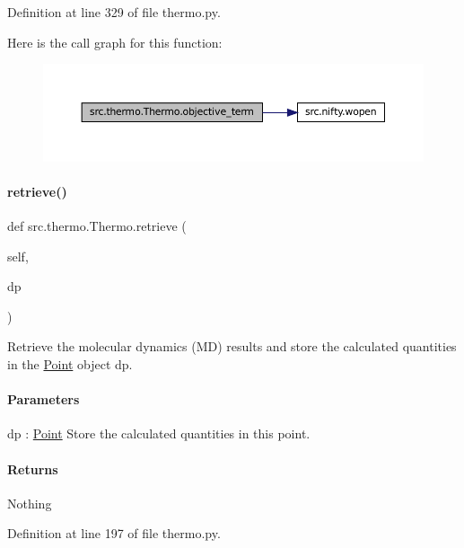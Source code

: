 Definition at line 329 of file thermo.\+py.

Here is the call graph for this function\+:
\nopagebreak
\begin{figure}[H]
\begin{center}
\leavevmode
\includegraphics[width=350pt]{classsrc_1_1thermo_1_1Thermo_abb7c8739b6b88d7dd08a80f5561ba6f1_cgraph}
\end{center}
\end{figure}
\mbox{\label{classsrc_1_1thermo_1_1Thermo_a9d63adfe6c3808c186a47d194de9d851}} 
\paragraph{\texorpdfstring{retrieve()}{retrieve()}}
{\footnotesize\ttfamily def src.\+thermo.\+Thermo.\+retrieve (\begin{DoxyParamCaption}\item[{}]{self,  }\item[{}]{dp }\end{DoxyParamCaption})}



Retrieve the molecular dynamics (MD) results and store the calculated quantities in the \hyperlink{classsrc_1_1thermo_1_1Point}{Point} object dp. 

\paragraph*{Parameters }

dp \+: \hyperlink{classsrc_1_1thermo_1_1Point}{Point} Store the calculated quantities in this point.

\paragraph*{Returns }

Nothing 

Definition at line 197 of file thermo.\+py.

